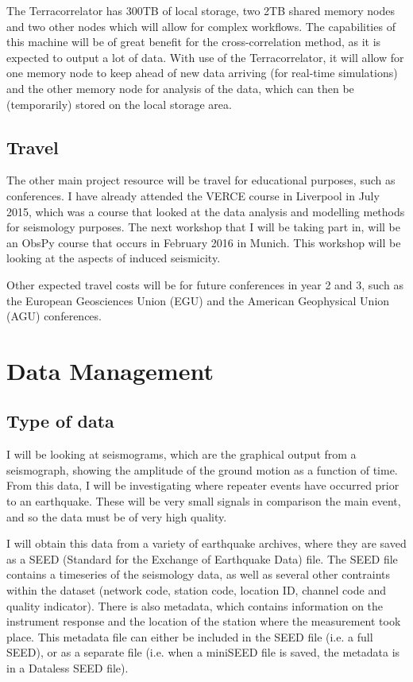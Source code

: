 \documentclass[12pt]{report}
\begin{document}
The Terracorrelator has 300TB of local storage, two 2TB shared memory nodes and two other nodes which will allow for complex workflows. The capabilities of this machine will be of great benefit for the cross-correlation method, as it is expected to output a lot of data. With use of the Terracorrelator, it will allow for one memory node to keep ahead of new data arriving (for real-time simulations) and the other memory node for analysis of the data, which can then be (temporarily) stored on the local storage area. 

\section{Travel}
The other main project resource will be travel for educational purposes, such as conferences. I have already attended the VERCE course in Liverpool in July 2015, which was a course that looked at the data analysis and modelling methods for seismology purposes. The next workshop that I will be taking part in, will be an ObsPy course that occurs in February 2016 in Munich. This workshop will be looking at the aspects of induced seismicity. 

Other expected travel costs will be for future conferences in year 2 and 3, such as the European Geosciences Union (EGU) and the American Geophysical Union (AGU) conferences. 

\chapter{Data Management}
\section{Type of data}
I will be looking at seismograms, which are the graphical output from a seismograph, showing the amplitude of the ground motion as a function of time. From this data, I will be investigating where repeater events have occurred prior to an earthquake. These will be very small signals in comparison the main event, and so the data must be of very high quality. 

I will obtain this data from a variety of earthquake archives, where they are saved as a SEED (Standard for the Exchange of Earthquake Data) file. The SEED file contains a timeseries of the seismology data, as well as several other contraints within the dataset (network code, station code, location ID, channel code and quality indicator). There is also metadata, which contains information on the instrument response and the location of the station where the measurement took place. This metadata file can either be included in the SEED file (i.e. a full SEED), or as a separate file (i.e. when a miniSEED file is saved, the metadata is in a Dataless SEED file).
\end{document}
